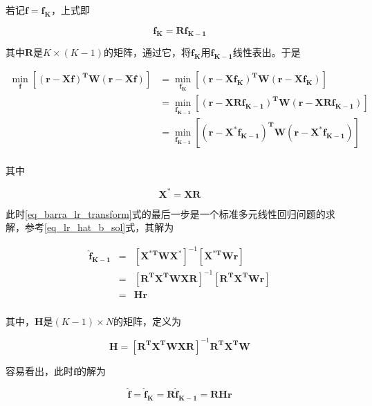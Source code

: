 若记$\bm{f} = \bm{f_{K}}$，上式即

\begin{equation}
    \bm{f_{K}} = \bm{R}\bm{f_{K-1}}
\end{equation}

其中$\bm{R}$是$K\times (K-1)$的矩阵，通过它，将$\bm{f_K}$用$\bm{f_{K-1}}$线性表出。于是

\begin{equation}\label{eq_barra_lr_transform}
    \begin{aligned}
        \min_{\bm{f}} [\bm{(r - Xf)^TW(r - Xf)}] & = \min_{\bm{f_K}} [\bm{(r - Xf_K)^TW(r - Xf_K)}]                 \\
                                                 & = \min_{\bm{f_{K-1}}} [\bm{(r - XRf_{K-1})^TW(r - XRf_{K-1})}]   \\
                                                 & = \min_{\bm{f_{K-1}}} [\bm{(r - X^*f_{K-1})^TW(r - X^*f_{K-1})}] \\
    \end{aligned}
\end{equation}

其中

\begin{equation}
    \bm{X^*} = \bm{XR}
\end{equation}

此时\ref{eq_barra_lr_transform}式的最后一步是一个标准多元线性回归问题的求解，参考\ref{eq_lr_hat_b_sol}式，其解为

\begin{equation}
    \begin{array}{rcl}
        \bm{\hat{f}_{K-1}} & = & [\bm{X^{*T}WX^*}]^{-1}[\bm{X^{*T}Wr}] \\
                           & = & [\bm{R^TX^TWXR}]^{-1}[\bm{R^TX^TWr}]  \\
                           & = & \bm{Hr}                               \\
    \end{array}
\end{equation}

其中，$\bm{H}$是$(K-1)\times N$的矩阵，定义为

\begin{equation}
    \bm{H} = [\bm{R^TX^TWXR}]^{-1}\bm{R^TX^TW}
\end{equation}

容易看出，此时$\bm{f}$的解为

\begin{equation}
    \bm{\hat{f}} = \bm{\hat{f}_{K}} = \bm{R\hat{f}_{K-1}}=\bm{RHr}
\end{equation}


